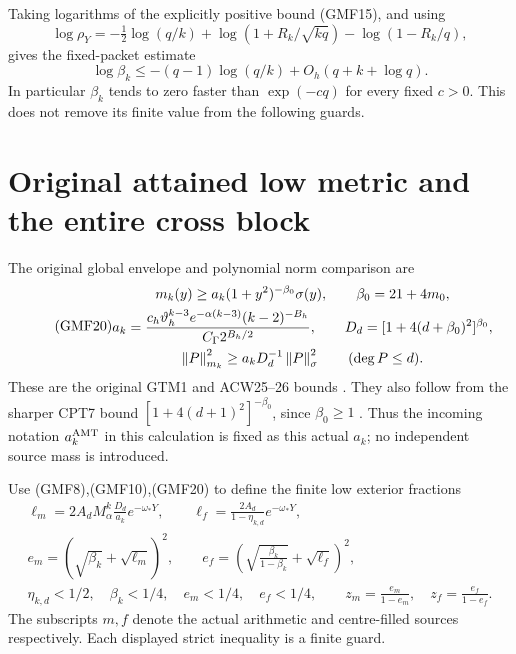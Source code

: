 Taking logarithms of the explicitly positive bound (GMF15),
and using
\[
 \log\rho_Y
 =-\tfrac12\log(q/k)
   +\log(1+R_k/\sqrt{kq})-\log(1-R_k/q),
\]
gives the fixed-packet estimate
\begin{equation}\tag{GMF19}
 \log\beta_k
 \le-(q-1)\log(q/k)+O_h(q+k+\log q).
\end{equation}
In particular \(\beta_k\) tends to zero faster than
\(\exp(-c q)\) for every fixed \(c>0\).
This does not remove its finite value from the following guards.

\section{Original attained low metric and the entire cross block}

The original global envelope and polynomial norm comparison are
\begin{equation}\tag{GMF20}
\begin{gathered}
 m_k(y)\ge a_k(1+y^2)^{-\beta_0}\sigma(y),\qquad
 \beta_0=21+4m_0,\\
 a_k=\frac{c_h\vartheta_h^{k-3}e^{-\alpha(k-3)}(k-2)^{-B_h}}
                 {C_\Gamma 2^{B_h/2}},\qquad
 D_d=[1+4(d+\beta_0)^2]^{\beta_0},\\
 \left\lVert P\right\rVert_{m_k}^2\ge a_kD_d^{-1}\left\lVert P\right\rVert_\sigma^2
                    \qquad(\deg P\le d).
\end{gathered}
\end{equation}
These are the original GTM1 and ACW25--26 bounds
\cite{a02gmf:providers,a02gmf:centralProvider}.  They also follow from
the sharper CPT7 bound
\([1+4(d+1)^2]^{-\beta_0}\), since \(\beta_0\ge1\)
\cite{a02gmf:cpt}.  Thus the incoming notation \(a_k^{\rm AMT}\)
in this calculation is fixed as this actual \(a_k\); no
independent source mass is introduced.

Use (GMF8),(GMF10),(GMF20) to define the finite low exterior
fractions
\begin{equation}\tag{GMF21}
\begin{gathered}
 \ell_m=
 2A_dM_\alpha^k\frac{D_d}{a_k}e^{-\omega_*Y},\qquad
 \ell_f=\frac{2A_d}{1-\eta_{k,d}}e^{-\omega_*Y},\\
 e_m=(\sqrt{\beta_k}+\sqrt{\ell_m})^2,\qquad
 e_f=\left(\sqrt{\frac{\beta_k}{1-\beta_k}}
                              +\sqrt{\ell_f}\right)^2,\\
 \eta_{k,d}<1/2,\quad \beta_k<1/4,\quad
 e_m<1/4,\quad e_f<1/4,\qquad
 z_m=\frac{e_m}{1-e_m},\quad z_f=\frac{e_f}{1-e_f}.
\end{gathered}
\end{equation}
The subscripts \(m,f\) denote the actual arithmetic and
centre-filled sources respectively.
Each displayed strict inequality is a finite guard.

